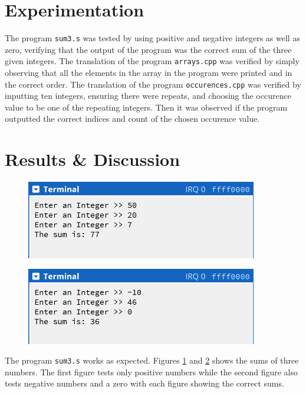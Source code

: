 \documentclass[11pt]{report}
\begin{document}
\section*{Experimentation}
The program \verb|sum3.s| was tested by using positive and negative integers as well as zero,
verifying that the output of the program was the correct sum of the three given integers. The
translation of the program \verb|arrays.cpp| was verified by simply observing that all the elements
in the array in the program were printed and in the correct order. The translation of the program
\verb|occurences.cpp| was verified by inputting ten integers, ensuring there were repeats, and
choosing the occurence value to be one of the repeating integers. Then it was observed if the
program outputted the correct indices and count of the chosen occurence value.

\section*{Results \& Discussion}
\begin{figure}[h!]
    \centering
    \includegraphics[width=0.9\textwidth]{sum3-terminal_positives}
    \label{fig:sum3-terminal_positives}
    \caption{}
\end{figure}

\begin{figure}[h!]
    \centering
    \includegraphics[width=0.9\textwidth]{sum3-terminal_negatives}
    \label{fig:sum3-terminal_negatives}
    \caption{}
\end{figure}

The program \verb|sum3.s| works as expected. Figures \ref{fig:sum3-terminal_positives} and
\ref{fig:sum3-terminal_negatives} shows the sums of three numbers. The first figure tests only
positive numbers while the second figure also tests negative numbers and a zero with each figure
showing the correct sums.
\end{document}

